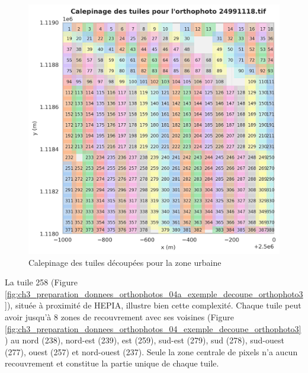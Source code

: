 \begin{figure}[H]
    \centering
    \includegraphics[width=1\linewidth]{02-main/figures/ch3/ch3_preparation_donnees_orthophotos_03_exemple_decoupe_orthophoto2.png}
    \caption{Calepinage des tuiles découpées pour la zone urbaine}
    \label{fig:ch3_preparation_donnees_orthophotos_03_exemple_decoupe_orthophoto2}
\end{figure}

\newpage
La tuile 258 (Figure \ref{fig:ch3_preparation_donnees_orthophotos_04a_exemple_decoupe_orthophoto3}), située à proximité de HEPIA, illustre bien cette complexité. Chaque tuile peut avoir jusqu'à 8 zones de recouvrement avec ses voisines (Figure \ref{fig:ch3_preparation_donnees_orthophotos_04_exemple_decoupe_orthophoto3}) au nord (238), nord-est (239), est (259), sud-est (279), sud (278), sud-ouest (277), ouest (257) et nord-ouest (237). Seule la zone centrale de \si{}  pixels n'a aucun recouvrement et constitue la partie unique de chaque tuile.

